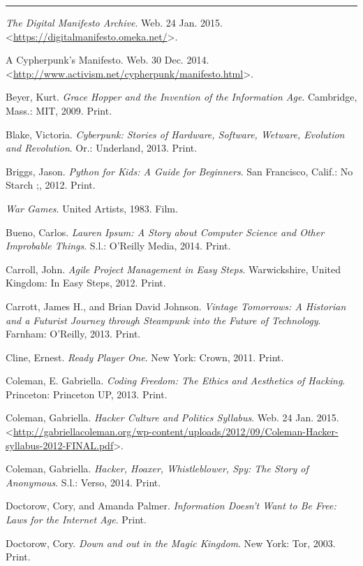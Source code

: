 \documentclass[letterpaper,10pt,english]{sphinxmanual}
\begin{document}
\bigskip\hrule{}\bigskip


\emph{The Digital Manifesto Archive}. Web. 24 Jan. 2015. \textless{}\href{https://digitalmanifesto.omeka.net/}{https://digitalmanifesto.omeka.net/}\textgreater{}.

A Cypherpunk's Manifesto. Web. 30 Dec. 2014. \textless{}\href{http://www.activism.net/cypherpunk/manifesto.html}{http://www.activism.net/cypherpunk/manifesto.html}\textgreater{}.

Beyer, Kurt. \emph{Grace Hopper and the Invention of the Information Age}.
Cambridge, Mass.: MIT, 2009. Print.

Blake, Victoria. \emph{Cyberpunk: Stories of Hardware, Software, Wetware,
Evolution and Revolution}. Or.: Underland, 2013. Print.

Briggs, Jason. \emph{Python for Kids: A Guide for Beginners}. San Francisco,
Calif.: No Starch ;, 2012. Print.

\emph{War Games}. United Artists, 1983. Film.

Bueno, Carlos. \emph{Lauren Ipsum: A Story about Computer Science and Other
Improbable Things}. S.l.: O'Reilly Media, 2014. Print.

Carroll, John. \emph{Agile Project Management in Easy Steps}. Warwickshire,
United Kingdom: In Easy Steps, 2012. Print.

Carrott, James H., and Brian David Johnson. \emph{Vintage Tomorrows: A Historian and a Futurist Journey through Steampunk into the Future of
Technology}. Farnham: O'Reilly, 2013. Print.

Cline, Ernest. \emph{Ready Player One}. New York: Crown, 2011. Print.

Coleman, E. Gabriella. \emph{Coding Freedom: The Ethics and Aesthetics of Hacking}. Princeton: Princeton UP, 2013. Print.

Coleman, Gabriella. \emph{Hacker Culture and Politics Syllabus}. Web. 24 Jan. 2015. \textless{}\href{http://gabriellacoleman.org/wp-content/uploads/2012/09/Coleman-Hacker-syllabus-2012-FINAL.pdf}{http://gabriellacoleman.org/wp-content/uploads/2012/09/Coleman-Hacker-syllabus-2012-FINAL.pdf}\textgreater{}.

Coleman, Gabriella. \emph{Hacker, Hoaxer, Whistleblower, Spy: The Story of Anonymous}. S.l.: Verso, 2014. Print.

Doctorow, Cory, and Amanda Palmer. \emph{Information Doesn't Want to Be Free: Laws for the Internet Age}. Print.

Doctorow, Cory. \emph{Down and out in the Magic Kingdom}. New York: Tor, 2003.
Print.
\end{document}

